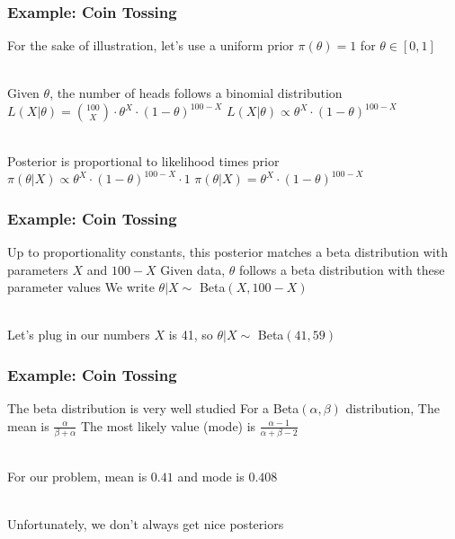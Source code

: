 \documentclass{beamer}
\begin{document}
\begin{frame}
    \frametitle{Example: Coin Tossing}

    \begin{outline}
        \1<+-> For the sake of illustration, let's use a uniform prior
            \2<+-> $\pi(\theta) = 1$ for $\theta \in [0, 1]$\\~\

        \1<+-> Given $\theta$, the number of heads follows a binomial distribution
            \2<+-> $L(X | \theta) = \binom{100}{X} \cdot \theta^X \cdot (1 - \theta)^{100 - X}$
            \vspace{1 mm}
            \2<+-> $L(X | \theta) \propto \theta^X \cdot (1 - \theta)^{100 - X}$\\~\

        \1<+-> Posterior is proportional to likelihood times prior
            \2<+-> $\pi(\theta | X) \propto \theta^X \cdot (1 - \theta)^{100 - X} \cdot 1$
            \2<+-> $\pi(\theta | X) = \theta^X \cdot (1 - \theta)^{100 - X}$
    \end{outline}
\end{frame}


\begin{frame}
    \frametitle{Example: Coin Tossing}

    \begin{outline}
        \1<+-> Up to proportionality constants, this posterior matches a beta distribution with parameters $X$ and $100 - X$
        \1<+-> Given data, $\theta$ follows a beta distribution with these parameter values
            \2<+-> We write $\theta|X \sim $ Beta$(X, 100-X)$\\~\

        \1<+-> Let's plug in our numbers
        \1<+-> $X$ is 41, so $\theta | X \sim$ Beta$(41, 59)$
    \end{outline}
\end{frame}

\begin{frame}
    \frametitle{Example: Coin Tossing}

    \begin{outline}
        \1<+-> The beta distribution is very well studied
        \1<+-> For a Beta$(\alpha, \beta)$ distribution,
            \2<+-> The mean is $\frac{\alpha}{\beta + \alpha}$
            \2<+-> The most likely value (mode) is $\frac{\alpha - 1}{\alpha + \beta - 2}$\\~\
    
        \1<+-> For our problem, mean is $0.41$ and mode is $0.408$\\~\

        \1<+-> Unfortunately, we don't always get nice posteriors
    \end{outline}
\end{frame}
\end{document}

